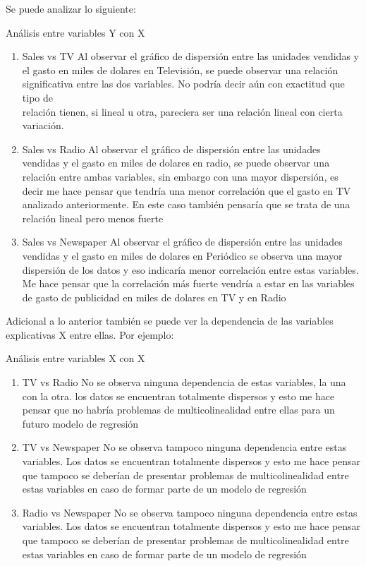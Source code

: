 \documentclass[11pt]{article}
\begin{document}
    Se puede analizar lo siguiente:

Análisis entre variables Y con X

\begin{enumerate}
\def\labelenumi{\arabic{enumi}.}
\item
  Sales vs TV Al observar el gráfico de dispersión entre las unidades
  vendidas y el gasto en miles de dolares en Televisión, se puede
  observar una relación significativa entre las dos variables. No podría
  decir aún con exactitud que tipo de\\
  relación tienen, si lineal u otra, pareciera ser una relación lineal
  con cierta variación.
\item
  Sales vs Radio Al observar el gráfico de dispersión entre las unidades
  vendidas y el gasto en miles de dolares en radio, se puede observar
  una relación entre ambas variables, sin embargo con una mayor
  dispersión, es decir me hace pensar que tendría una menor correlación
  que el gasto en TV analizado anteriormente. En este caso también
  pensaría que se trata de una relación lineal pero menos fuerte
\item
  Sales vs Newspaper Al observar el gráfico de dispersión entre las
  unidades vendidas y el gasto en miles de dolares en Periódico se
  observa una mayor dispersión de los datos y eso indicaría menor
  correlación entre estas variables. Me hace pensar que la correlación
  más fuerte vendría a estar en las variables de gasto de publicidad en
  miles de dolares en TV y en Radio
\end{enumerate}

Adicional a lo anterior también se puede ver la dependencia de las
variables explicativas X entre ellas. Por ejemplo:

Análisis entre variables X con X

\begin{enumerate}
\def\labelenumi{\arabic{enumi}.}
\setcounter{enumi}{3}
\item
  TV vs Radio No se observa ninguna dependencia de estas variables, la
  una con la otra. los datos se encuentran totalmente dispersos y esto
  me hace pensar que no habría problemas de multicolinealidad entre
  ellas para un futuro modelo de regresión
\item
  TV vs Newspaper No se observa tampoco ninguna dependencia entre estas
  variables. Los datos se encuentran totalmente dispersos y esto me hace
  pensar que tampoco se deberían de presentar problemas de
  multicolinealidad entre estas variables en caso de formar parte de un
  modelo de regresión
\item
  Radio vs Newspaper No se observa tampoco ninguna dependencia entre
  estas variables. Los datos se encuentran totalmente dispersos y esto
  me hace pensar que tampoco se deberían de presentar problemas de
  multicolinealidad entre estas variables en caso de formar parte de un
  modelo de regresión
\end{enumerate}
\end{document}
